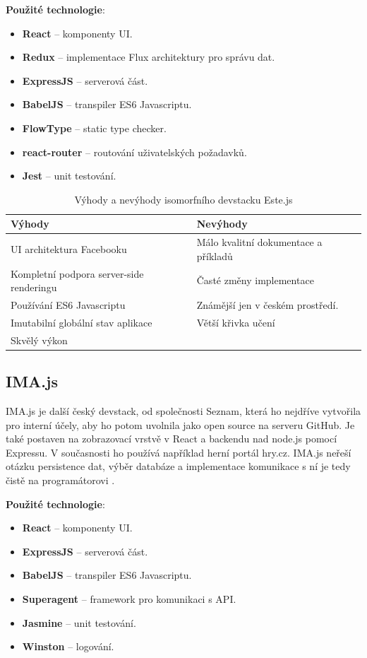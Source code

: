 \vspace{0,3cm}
\noindent \textbf{Použité technologie}:
\begin{itemize}
\item \textbf{React} – komponenty UI.
\item \textbf{Redux} – implementace Flux architektury pro správu dat.
\item \textbf{ExpressJS} – serverová část.
\item \textbf{BabelJS} – transpiler ES6 Javascriptu.
\item \textbf{FlowType} – static type checker.
\item \textbf{react-router} – routování uživatelských požadavků.
\item \textbf{Jest} – unit testování.
\end{itemize}

\begin{table}[h]
\centering
	\caption{Výhody a nevýhody isomorfního devstacku Este.js \cite{isomorphic_pimentel}}
	\begin{tabular}{ |C{5cm}|C{5cm}| }
	\hline
	Výhody & Nevýhody \\ \hline
	UI architektura Facebooku & Málo kvalitní dokumentace a příkladů \\ \hline
	Kompletní podpora server-side renderingu & Časté změny implementace\\ \hline
	Používání ES6 Javascriptu & Známější jen v českém prostředí.\\ \hline
	Imutabilní globální stav aplikace & Větší křivka učení\\ \hline
	Skvělý výkon & \\ \hline
    \end{tabular}
	\label{tab:proscons_este}
\end{table}
\FloatBarrier

\subsection{IMA.js}
IMA.js je další český devstack, od společnosti Seznam, která ho nejdříve vytvořila pro interní účely, aby ho potom uvolnila jako open source na serveru GitHub. Je také postaven na zobrazovací vrstvě v React a backendu nad node.js pomocí Expressu. V současnosti ho používá například herní portál hry.cz. IMA.js neřeší otázku persistence dat, výběr databáze a implementace komunikace s ní je tedy čistě na programátorovi \cite{ima}.

\pagebreak
\vspace{3mm}
\noindent \textbf{Použité technologie}:
\begin{itemize}
\item \textbf{React} – komponenty UI.
\item \textbf{ExpressJS} – serverová část.
\item \textbf{BabelJS} – transpiler ES6 Javascriptu.
\item \textbf{Superagent} – framework pro komunikaci s API.
\item \textbf{Jasmine} – unit testování.
\item \textbf{Winston} – logování.
\end{itemize}

